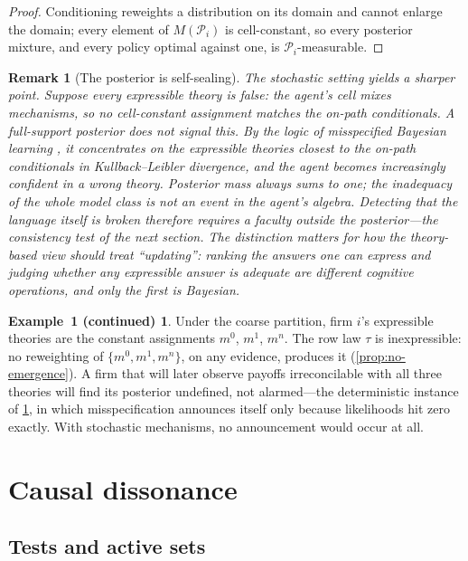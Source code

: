 \documentclass[11pt]{article}
\newtheorem{remark}[assumption]{Remark}
\theoremstyle{definition}
\newtheorem*{excont}{Example~1 (continued)}
\begin{document}
\begin{proof}
Conditioning reweights a distribution on its domain and cannot enlarge the
domain; every element of $M(\mathcal P_i)$ is cell-constant, so every
posterior mixture, and every policy optimal against one, is
$\mathcal P_i$-measurable.
\end{proof}

\begin{remark}[The posterior is self-sealing]
\label{rem:self-sealing}
The stochastic setting yields a sharper point.  Suppose every expressible
theory is false: the agent's cell mixes mechanisms, so no cell-constant
assignment matches the on-path conditionals.  A full-support posterior does
not signal this.  By the logic of misspecified Bayesian learning
\citep{Berk1966}, it concentrates on the expressible theories closest to the
on-path conditionals in Kullback--Leibler divergence, and the agent becomes
increasingly \emph{confident} in a wrong theory.  Posterior mass always sums
to one; the inadequacy of the whole model class is not an event in the
agent's algebra.  Detecting that the language itself is broken therefore
requires a faculty outside the posterior---the consistency test of the next
section.  The distinction matters for how the theory-based view should treat
``updating'': ranking the answers one can express and judging whether any
expressible answer is adequate are different cognitive operations, and only
the first is Bayesian.
\end{remark}

\begin{excont}
Under the coarse partition, firm $i$'s expressible theories are the constant
assignments $m^0$, $m^1$, $m^n$.  The row law $\tau$ is inexpressible: no
reweighting of $\{m^0,m^1,m^n\}$, on any evidence, produces it
(\cref{prop:no-emergence}).  A firm that will later observe payoffs
irreconcilable with all three theories will find its posterior undefined, not
alarmed---the deterministic instance of \cref{rem:self-sealing}, in which
misspecification announces itself only because likelihoods hit zero exactly.
With stochastic mechanisms, no announcement would occur at all.
\end{excont}
\section{Causal dissonance}
\label{sec:dissonance}

\subsection{Tests and active sets}
\end{document}
